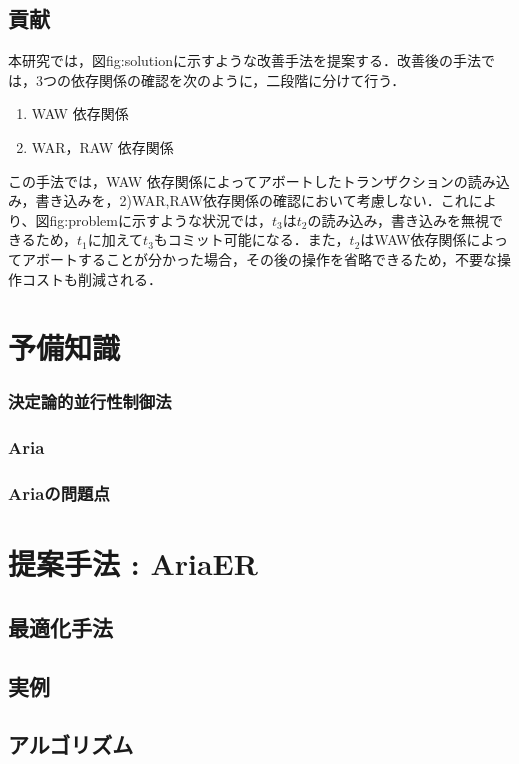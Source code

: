 \documentclass[submit]{ipsj}
\begin{document}
\subsection{貢献}
本研究では，図{fig:solution}に示すような改善手法を提案する．改善後の手法では，3つの依存関係の確認を次のように，二段階に分けて行う．
\begin{enumerate}
    \item WAW 依存関係
    \item WAR，RAW 依存関係
\end{enumerate}
この手法では，WAW 依存関係によってアボートしたトランザクションの読み込み，書き込みを，2)WAR,RAW依存関係の確認において考慮しない．これにより、図{fig:problem}に示すような状況では，$t_3$は$t_2$の読み込み，書き込みを無視できるため，$t_1$に加えて$t_3$もコミット可能になる．また，$t_2$はWAW依存関係によってアボートすることが分かった場合，その後の操作を省略できるため，不要な操作コストも削減される．


\section{予備知識}
\subsubsection{決定論的並行性制御法}

\subsubsection{Aria}

\subsubsection{Ariaの問題点}

\section{提案手法 : AriaER}
\subsection{最適化手法}
\subsection{実例}
\subsection{アルゴリズム}
\end{document}
